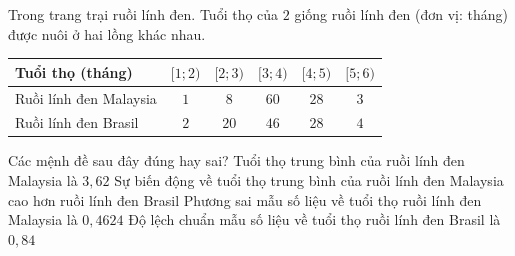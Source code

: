 \begin{ex}%

	Trong trang trại ruồi lính đen. Tuổi thọ của $2$ giống ruồi lính đen (đơn vị: tháng) được nuôi ở hai lồng khác nhau.
	\begin{center}
		\begin{tabular}{|l|c|c|c|c|c|}
			\hline
			Tuổi thọ (tháng) & $[1;2)$ & $[2;3)$ & $[3;4)$ & $[4;5)$ & $[5;6)$ \\
			\hline
			Ruồi lính đen Malaysia & $1$ & $8$ & $60$ & $28$ & $3$ \\
			\hline
			Ruồi lính đen Brasil & $2$ & $20$ & $46$ & $28$ & $4$ \\
			\hline
		\end{tabular}	
	\end{center}
	Các mệnh đề sau đây đúng hay sai?
	\choiceTF
	{Tuổi thọ trung bình của ruồi lính đen Malaysia là $3{,}62$}
	{Sự biến động về tuổi thọ trung bình của ruồi lính đen Malaysia cao hơn ruồi lính đen Brasil}
	{\True Phương sai mẫu số liệu về tuổi thọ ruồi lính đen Malaysia là $0{,}4624$}
	{\True Độ lệch chuẩn mẫu số liệu về tuổi thọ ruồi lính đen Brasil là $0{,}84$}
\end{ex}
